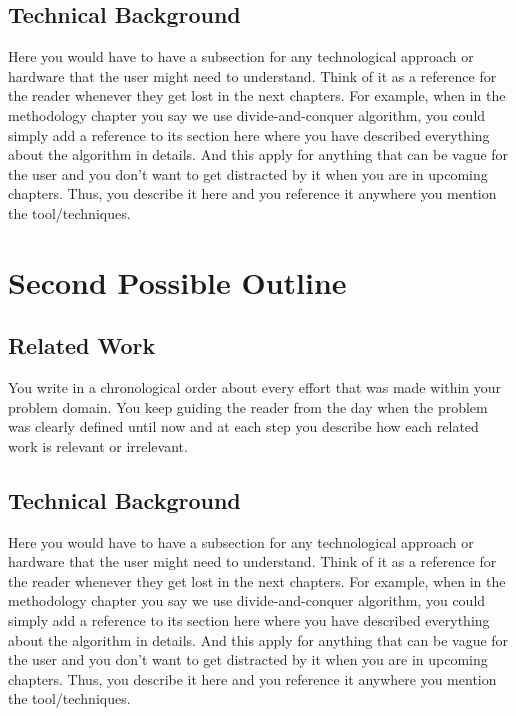 \subsection{Technical Background}
\label{sub:technical_background}

Here you would have to have a subsection for any technological approach or hardware that the user might need to understand. Think of it as a reference for the reader whenever they get lost in the next chapters. For example, when in the methodology chapter you say we use divide-and-conquer algorithm, you could simply add a reference to its section here where you have described everything about the algorithm in details. And this apply for anything that can be vague for the user and you don't want to get distracted by it when you are in upcoming chapters. Thus, you describe it here and you reference it anywhere you mention the tool/techniques.

\section{Second Possible Outline}
\label{sec:second_possible_outline}

\subsection{Related Work}
\label{sub:related_work2}

You write in a chronological order about every effort that was made within your problem domain. You keep guiding the reader from the day when the problem was clearly defined until now and at each step you describe how each related work is relevant or irrelevant.

\subsection{Technical Background}
\label{sub:technical_background2}

Here you would have to have a subsection for any technological approach or hardware that the user might need to understand. Think of it as a reference for the reader whenever they get lost in the next chapters. For example, when in the methodology chapter you say we use divide-and-conquer algorithm, you could simply add a reference to its section here where you have described everything about the algorithm in details. And this apply for anything that can be vague for the user and you don't want to get distracted by it when you are in upcoming chapters. Thus, you describe it here and you reference it anywhere you mention the tool/techniques.